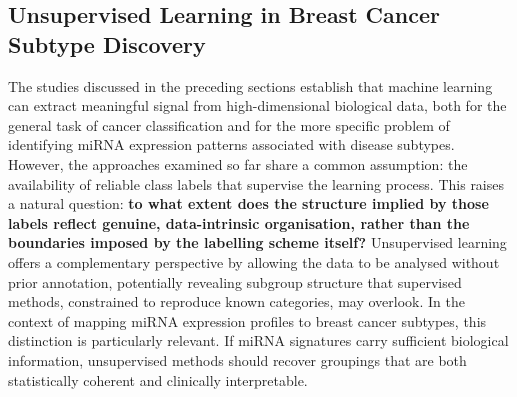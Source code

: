 
\subsection{Unsupervised Learning in Breast Cancer Subtype Discovery}
\label{sec:background:unsupervised}

The studies discussed in the preceding sections establish that machine learning can extract meaningful signal from high-dimensional biological data, both for the general task of cancer classification and for the more specific problem of identifying miRNA expression patterns associated with disease subtypes. However, the approaches examined so far share a common assumption: the availability of reliable class labels that supervise the learning process. This raises a natural question: \textbf{to what extent does the structure implied by those labels reflect genuine, data-intrinsic organisation, rather than the boundaries imposed by the labelling scheme itself?} Unsupervised learning offers a complementary perspective by allowing the data to be analysed without prior annotation, potentially revealing subgroup structure that supervised methods, constrained to reproduce known categories, may overlook. In the context of mapping miRNA expression profiles to breast cancer subtypes, this distinction is particularly relevant. If miRNA signatures carry sufficient biological information, unsupervised methods should recover groupings that are both statistically coherent and clinically interpretable.

